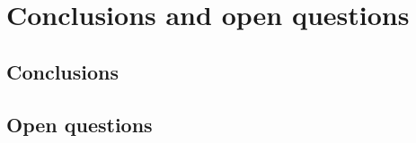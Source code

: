 \chapter{Conclusions and open questions} %
\label{Chapter6}
\section{Conclusions}
\section{Open questions} %

